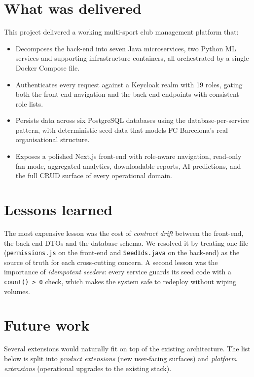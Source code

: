 \documentclass[12pt,a4paper,oneside]{report}
\begin{document}
\section{What was delivered}
This project delivered a working multi-sport club management platform that:
\begin{itemize}[leftmargin=*]
  \item Decomposes the back-end into seven Java microservices, two
        Python ML services and supporting infrastructure containers,
        all orchestrated by a single Docker Compose file.
  \item Authenticates every request against a Keycloak realm with 19
        roles, gating both the front-end navigation and the back-end
        endpoints with consistent role lists.
  \item Persists data across six PostgreSQL databases using the
        database-per-service pattern, with deterministic seed data that
        models FC Barcelona's real organisational structure.
  \item Exposes a polished Next.js front-end with role-aware navigation,
        read-only fan mode, aggregated analytics, downloadable reports,
        AI predictions, and the full CRUD surface of every operational
        domain.
\end{itemize}

\section{Lessons learned}
The most expensive lesson was the cost of \emph{contract drift} between
the front-end, the back-end DTOs and the database schema. We resolved it
by treating one file (\texttt{permissions.js} on the front-end and
\texttt{SeedIds.java} on the back-end) as the source of truth for each
cross-cutting concern. A second lesson was the importance of
\emph{idempotent seeders}: every service guards its seed code with a
\texttt{count() > 0} check, which makes the system safe to redeploy
without wiping volumes.

\section{Future work}
Several extensions would naturally fit on top of the existing
architecture. The list below is split into \emph{product extensions}
(new user-facing surfaces) and \emph{platform extensions} (operational
upgrades to the existing stack).
\end{document}
